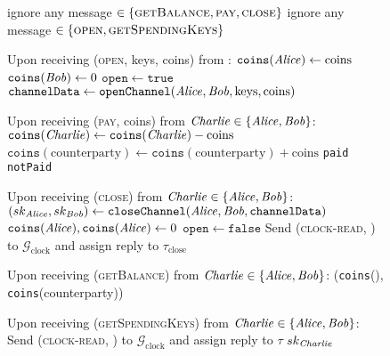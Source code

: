 \begin{figure}[H]
  \begin{systembox}{\chanfunc}
    \begin{algorithmic}[1]
        \State ignore any message $\in \{\textsc{getBalance}, \textsc{pay},
        \textsc{close}\}$
      \Else
        \State ignore any message $\in \{\textsc{open},
        \textsc{getSpendingKeys}\}$
      \EndIf
      \Statex

      \State Upon receiving (\textsc{open}, keys, coins) from \alice:
      \Indent
        \State $\mathtt{coins}(\mathit{Alice}) \gets \mathrm{coins}$
        \State $\mathtt{coins}(\mathit{Bob}) \gets 0$
        \State $\mathtt{open} \gets \mathtt{true}$
        \State $\mathtt{channelData} \gets \mathtt{openChannel}(\mathit{Alice}, \mathit{Bob},
        \mathrm{keys}, \mathrm{coins})$ 
      \EndIndent
      \Statex

      \State Upon receiving (\textsc{pay}, coins) from $\mathit{Charlie} \in \{\mathit{Alice},
      \mathit{Bob}\}$:
      \Indent
          \State $\mathtt{coins}(\mathit{Charlie}) \gets \mathtt{coins}(\mathit{Charlie}) -
          \mathrm{coins}$
          \State $\mathtt{coins}(\mathrm{counterparty}) \gets
          \mathtt{coins}(\mathrm{counterparty}) + \mathrm{coins}$
          \State \Return \texttt{paid}
        \Else
          \State \Return \texttt{notPaid}
        \EndIf
      \EndIndent
      \Statex

      \State Upon receiving (\textsc{close}) from $\mathit{Charlie} \in \{\mathit{Alice},
      \mathit{Bob}\}$:
      \Indent
        \State $(sk_{\mathit{Alice}}, sk_{\mathit{Bob}}) \gets \mathtt{closeChannel}(\mathit{Alice},
        \mathit{Bob}, \mathtt{channelData})$ 
        \State $\mathtt{coins}(\mathit{Alice}), \mathtt{coins}(\mathit{Alice}) \gets 0$
        \State $\mathtt{open} \gets \mathtt{false}$
        \State Send (\textsc{clock-read}, \chanfunc) to
        $\mathcal{G}_{\mathrm{clock}}$ and assign reply to
        $\tau_{\mathrm{close}}$
      \EndIndent
      \Statex

      \State Upon receiving (\textsc{getBalance}) from $\mathit{Charlie} \in \{\mathit{Alice},
      \mathit{Bob}\}$:
      \Indent
        \State \Return (\texttt{coins}(\charlie), \texttt{coins}(counterparty))
      \EndIndent
      \Statex

      \State Upon receiving (\textsc{getSpendingKeys}) from $\mathit{Charlie} \in \{\mathit{Alice},
      \mathit{Bob}\}$:
      \Indent
        \State Send (\textsc{clock-read}, \chanfunc) to
        $\mathcal{G}_{\mathrm{clock}}$ and assign reply to $\tau$
          \State \Return $sk_{\mathit{Charlie}}$
        \EndIf
      \EndIndent
    \end{algorithmic}
  \end{systembox}
  \caption{}
  \label{alg:chanfunc}
\end{figure}
